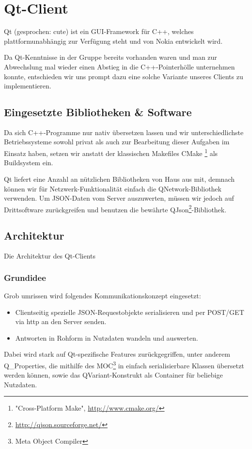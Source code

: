 \documentclass[12pt, a4paper]{scrartcl}
\begin{document}
\clearpage
\section{Qt-Client}

Qt (gesprochen: cute) ist ein GUI-Framework für C++, welches
plattformunabhängig zur Verfügung steht und von Nokia entwickelt wird.

Da Qt-Kenntnisse in der Gruppe bereits vorhanden waren und man zur Abwechslung mal wieder einen Abstieg in die C++-Pointerhölle unternehmen konnte, entschieden wir uns prompt dazu eine solche Variante unseres Clients zu implementieren.
\np

\subsection{Eingesetzte Bibliotheken \& Software}
Da sich C++-Programme nur nativ übersetzen lassen und wir unterschiedlichste 
Betriebssysteme sowohl privat als auch zur Bearbeitung dieser Aufgaben im Einsatz 
haben, setzen wir anstatt der klassischen Makefiles CMake
\footnote{"Cross-Platform Make", \url{http://www.cmake.org/}} als Buildsystem ein.
\np
 
Qt liefert eine Anzahl an nützlichen Bibliotheken von Haus aus mit, demnach
können wir für Netzwerk-Funktionalität einfach die QNetwork-Bibliothek verwenden.
Um JSON-Daten vom Server auszuwerten, müssen wir jedoch auf Drittsoftware
zurückgreifen und benutzen die bewährte QJson\footnote{\url{http://qjson.sourceforge.net/}}-Bibliothek.
\np
\subsection{Architektur}
Die Architektur des Qt-Clients

\subsubsection{Grundidee}
Grob umrissen wird folgendes Kommunikationskonzept eingesetzt:

\begin{itemize}
	\item Clientseitig spezielle JSON-Requestobjekte serialisieren und per POST/GET via http an den Server senden.
	\item Antworten in Rohform in Nutzdaten wandeln und auswerten.
\end{itemize}

Dabei wird stark auf Qt-spezifische Features zurückgegriffen, unter anderem Q\_Properties, die mithilfe des MOC\footnote{Meta Object Compiler} in einfach serialisierbare Klassen übersetzt werden können, sowie das QVariant-Konstrukt als Container für beliebige Nutzdaten.   
\end{document}
